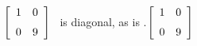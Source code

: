 {$\left[ \begin {array}{cc} 1&0\\\noalign{\medskip}0&9\end {array}
 \right] $} 
{\tta\ is diagonal, as is \ttat.$\left[ \begin {array}{cc} 1&0\\\noalign{\medskip}0&9\end {array} \right]$}


  

